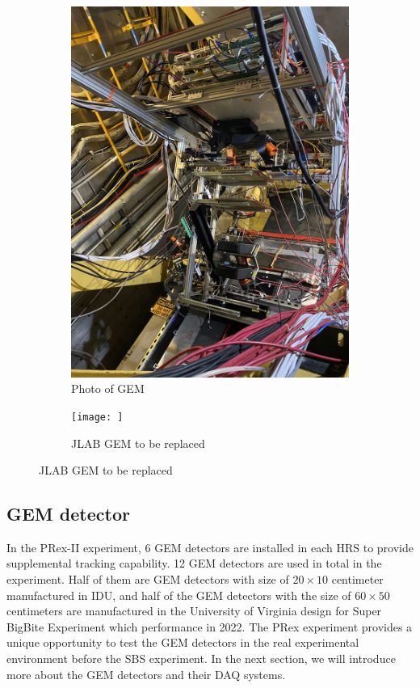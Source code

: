 \begin{figure}
     \centering
     \begin{subfigure}[b]{0.45\textwidth}
         \centering
         \includegraphics[width=\textwidth]{images/chap3/quartz_at.jpg}
         \caption{Photo of GEM}
         \label{Photo of CEBAF}
     \end{subfigure}
     \hfill
     \begin{subfigure}[b]{0.45\textwidth}
         \centering
         \texttt{[image: ]}
         \caption{JLAB GEM to be replaced}
         \label{gem_structure}
     \end{subfigure}
\end{figure}


\subsection{GEM detector}

In the PRex-II experiment, 6 GEM detectors are installed in each HRS to provide supplemental tracking capability. 12 GEM detectors are used in total in the experiment. Half of them are GEM detectors with size of $20\times 10$ centimeter manufactured in IDU, and half of the GEM detectors with the size of $60\times 50$ centimeters are manufactured in the University of Virginia design for Super BigBite Experiment which performance in 2022. The PRex experiment provides a unique opportunity to test the GEM detectors in the real experimental environment before the SBS experiment. In the next section, we will introduce more about the GEM detectors and their DAQ systems. 

